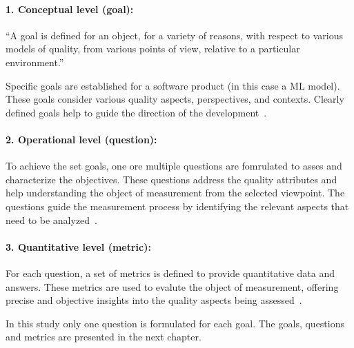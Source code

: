\paragraph{1. Conceptual level (goal):}
``A goal is defined for an object, for a variety of reasons,
with respect to various models of quality, from various points of view, relative to a
particular environment.''~\cite[p. 3]{basili_goalquestionmetric_}

Specific goals are established for a software product (in this case a \ac{ML} model).
These goals consider various quality aspects, perspectives, and contexts.
Clearly defined goals help to guide the direction of the development~\cite[p. 3]{basili_goalquestionmetric_}.

\paragraph{2. Operational level (question):}
To achieve the set goals, one ore multiple questions are fomrulated to asses and characterize the objectives.
These questions address the quality attributes and help understanding the object of measurement from the selected
viewpoint.
The questions guide the measurement process by identifying the relevant aspects that need to be
analyzed~\cite[p. 3]{basili_goalquestionmetric_}.

\paragraph{3. Quantitative level (metric):}
For each question, a set of metrics is defined to provide quantitative data and answers.
These metrics are used to evalute the object of measurement, offering precise and objective insights into the
quality aspects being assessed~\cite[p. 3]{basili_goalquestionmetric_}.

In this study only one question is formulated for each goal.
The goals, questions and metrics are presented in the next chapter.
